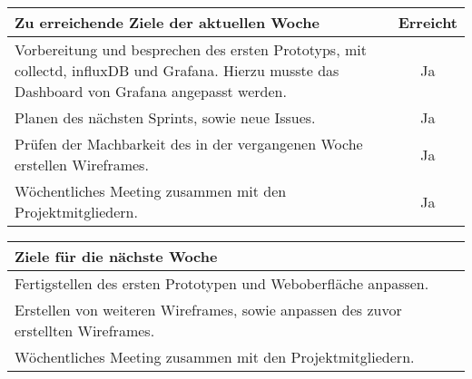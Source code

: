 \begin{tabularx}{\textwidth}{Xc}
    \arrayrulecolor{OliveGreen}
    \toprule
    {\bfseries Zu erreichende Ziele der aktuellen Woche} & {\bfseries Erreicht} \\
    \midrule[2pt]
    Vorbereitung und besprechen des ersten Prototyps, mit collectd, influxDB
    und Grafana. Hierzu musste das Dashboard von Grafana angepasst werden.&Ja\\
    \rowcolor{OliveGreen!15}
    Planen des nächsten Sprints, sowie neue Issues.                     &Ja   \\
    \rowcolor{White}
    Prüfen der Machbarkeit des in der vergangenen Woche erstellen Wireframes. &Ja   \\
    \rowcolor{OliveGreen!15}
    Wöchentliches Meeting zusammen mit den Projektmitgliedern.          &Ja   \\
   \bottomrule[2pt]
\end{tabularx}
%
\vspace{1cm}
%
\begin{tabularx}{\textwidth}{Xc}
    \arrayrulecolor{OliveGreen}
    \toprule
    {\bfseries Ziele für die nächste Woche}          &                      \\
    \midrule[2pt]
    Fertigstellen des ersten Prototypen und Weboberfläche anpassen.    &     \\
    \rowcolor{OliveGreen!15}
    Erstellen von weiteren Wireframes, sowie anpassen des zuvor erstellten
    Wireframes.                         &                      \\
    \rowcolor{White}
    Wöchentliches Meeting zusammen mit den Projektmitgliedern. & \\
\end{tabularx}
